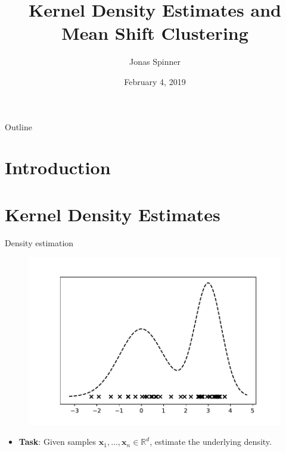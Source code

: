 \documentclass[18pt]{beamer}
\title{Kernel Density Estimates and Mean Shift Clustering}
\author{Jonas Spinner}
\date{February 4, 2019}
\institute{Analytics and Statistics at the Institute of Operations Research}
\begin{document}

\begin{frame}
\titlepage
\end{frame}

\begin{frame}{Outline}
	\tableofcontents
\end{frame}


\section{Introduction}


\section{Kernel Density Estimates}

\begin{frame}{Density estimation}
	\begin{figure}
		\tiny
		\centering
		\includegraphics[height=0.5\textheight]{figures/samples-and-underlying-pdf}
	\end{figure}
	\vspace*{-4mm}
	\begin{itemize}
		\item \textbf{Task}: Given samples $\bm{x}_1, ..., \bm{x}_n \in \mathbb{R}^d$, estimate the underlying density.
	\end{itemize}
\end{frame}
\end{document}

